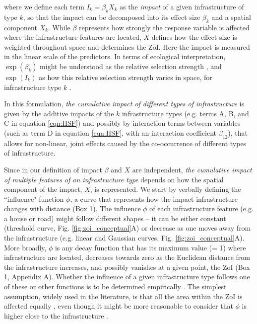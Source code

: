\documentclass[titlepage]{article}
\begin{document}
where we define each term $I_k = \beta_k X_k$ as the \textit{impact} of a given infrastructure of type $k$, so that the impact can be decomposed into its effect size $\beta_k$ and a spatial component $X_k$. While $\beta$ represents how strongly the response variable is affected where the infrastructure features are located, $X$ defines how the effect size is weighted throughout space and determines the ZoI. Here the impact is measured in the linear scale of the predictors. In terms of ecological interpretation, $\exp(\beta_k)$ might be understood as the relative selection strength \citep{avgar_relative_2017}, and $\exp(I_k)$ as how this relative selection strength varies in space, for infrastructure type $k$ \citep{fieberg_how_2021}.

In this formulation, \textit{the cumulative impact of different types of infrastructure} is given by the additive impacts of the $k$ infrastructure types (e.g. terms A, B, and C in equation \ref{eqn:HSF}) and possibly by interaction terms between variables (such as term D in equation \ref{eqn:HSF}, with an interaction coefficient $\beta_{12}$), that allows for non-linear, joint effects caused by the co-occurrence of different types of infrastructure. 

Since in our definition of impact $\beta$ and $X$ are independent, \textit{the cumulative impact of multiple features of an infrastructure type} depends on how the spatial component of the impact, $X$, is represented. We start by verbally defining the ``influence" function $\phi$, a curve that represents how the impact infrastructure changes with distance (Box 1). The influence $\phi$ of each infrastructure feature (e.g. a house or road) might follow different shapes -- it can be either constant (threshold curve, Fig. \ref{fig:zoi_conceptual}A) or decrease as one moves away from the infrastructure (e.g. linear and Gaussian curves, Fig. \ref{fig:zoi_conceptual}A). More broadly, $\phi$ is any decay function that has its maximum value (= 1) where infrastructure are located, decreases towards zero as the Euclidean distance from the infrastructure increases, and possibly vanishes at a given point, the ZoI (Box 1, Appendix A). Whether the influence of a given infrastructure type follows one of these or other functions is to be determined empirically \citep{miguet_how_2017}. The simplest assumption, widely used in the literature, is that all the area within the ZoI is affected equally \citep[a buffer around features; e.g][]{quinonezpinon_design_2007}, even though it might be more reasonable to consider that $\phi$ is higher close to the infrastructure \citep[][]{skarin_out_2018, zeller_multi-level_2017}. 
\end{document}
